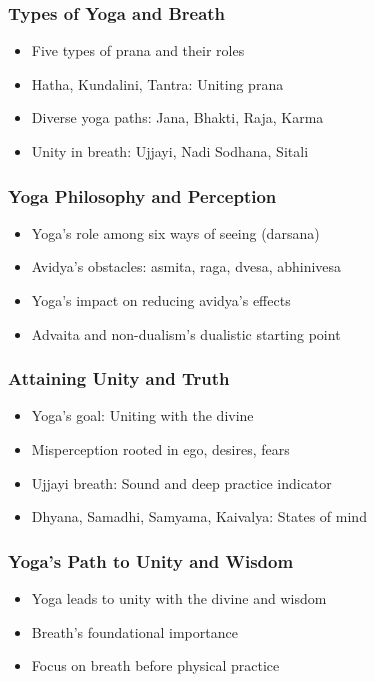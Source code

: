 \begin{frame}[fragile]\frametitle{Types of Yoga and Breath}
\begin{itemize}
\item Five types of prana and their roles
\item Hatha, Kundalini, Tantra: Uniting prana
\item Diverse yoga paths: Jana, Bhakti, Raja, Karma
\item Unity in breath: Ujjayi, Nadi Sodhana, Sitali
\end{itemize}
\end{frame}

\begin{frame}[fragile]\frametitle{Yoga Philosophy and Perception}
\begin{itemize}
\item Yoga's role among six ways of seeing (darsana)
\item Avidya's obstacles: asmita, raga, dvesa, abhinivesa
\item Yoga's impact on reducing avidya's effects
\item Advaita and non-dualism's dualistic starting point
\end{itemize}
\end{frame}

\begin{frame}[fragile]\frametitle{Attaining Unity and Truth}
\begin{itemize}
\item Yoga's goal: Uniting with the divine
\item Misperception rooted in ego, desires, fears
\item Ujjayi breath: Sound and deep practice indicator
\item Dhyana, Samadhi, Samyama, Kaivalya: States of mind
\end{itemize}
\end{frame}

\begin{frame}[fragile]\frametitle{Yoga's Path to Unity and Wisdom}
\begin{itemize}
\item Yoga leads to unity with the divine and wisdom
\item Breath's foundational importance
\item Focus on breath before physical practice
\end{itemize}
\end{frame}

